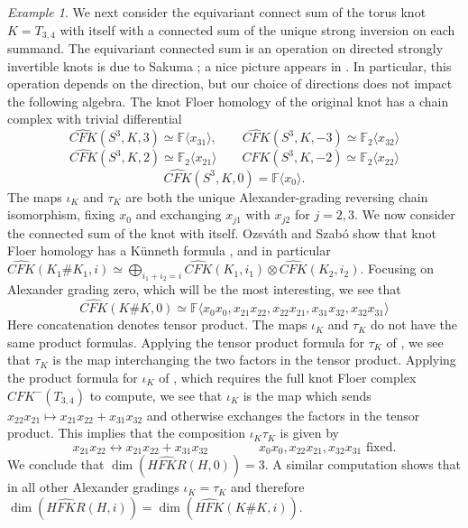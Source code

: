 \documentclass[11pt,reqno]{amsart}
\theoremstyle{definition}
\theoremstyle{remark}
\newtheorem{example}[thm]{Example}
\newcommand{\bF}{\mathbb{F}}
\newcommand{\CFK}{\mathit{CFK}}
\newcommand{\HFK}{\mathit{HFK}}
\newcommand\CFKhat{\widehat{\CFK}}
\newcommand\HFKhat{\widehat{\HFK}}
\newcommand \HFKR{ \widehat{\mathit{HFKR}}}
\numberwithin{equation}{section}
\begin{document}
\begin{example}
We next consider the equivariant connect sum of the torus knot $K=T_{3,4}$ with itself with a connected sum of the unique strong inversion on each summand. The equivariant connected sum is an operation on directed strongly invertible knots is due to Sakuma \cite{Sakumainvertible}; a nice picture appears in \cite[Definition 2.4]{DMS:equivariant}. In particular, this operation depends on the direction, but our choice of directions does not impact the following algebra. The knot Floer homology of the original knot has a chain complex with trivial differential 
%
\[\CFKhat(S^3,K,3) \simeq \mathbb F\langle x_{31} \rangle, \qquad \CFKhat(S^3,K,-3) \simeq \mathbb F_2\langle x_{32} \rangle\] \[ \CFKhat(S^3,K,2) \simeq \mathbb F_2\langle x_{21} \rangle\qquad \CFKhat(S^3,K,-2) \simeq \mathbb F_2\langle x_{22} \rangle \] \[\CFKhat(S^3,K, 0) = \mathbb F \langle x_0 \rangle.\] 
%
The maps $\iota_K$ and $\tau_K$ are both the unique Alexander-grading reversing chain isomorphism, fixing $x_0$ and exchanging $x_{j1}$ with $x_{j2}$ for $j=2,3$. We now consider the connected sum of the knot with itself. Ozsv{\'a}th and Szab{\'o} show that knot Floer homology has a K{\"u}nneth formula \cite[Section 7]{OSKnots}, and in particular $\CFKhat(K_1 \# K_1, i) \simeq \bigoplus_{i_1+i_2=i} \CFKhat(K_1,i_1) \otimes \CFKhat(K_2,i_2)$. Focusing on Alexander grading zero, which will be the most interesting, we see that
%
\[ \CFKhat(K\#K, 0) \simeq \bF \langle x_0x_0, x_{21}x_{22}, x_{22}x_{21}, x_{31}x_{32}, x_{32}x_{31} \rangle \]
%
Here concatenation denotes tensor product. The maps $\iota_K$ and $\tau_K$ do not have the same product formulas. Applying the tensor product formula for $\tau_K$ of \cite[Theorem 1.7]{DMS:equivariant}, we see that $\tau_K$ is the map interchanging the two factors in the tensor product. Applying the product formula for $\iota_K$ of \cite[Theorem 1.1]{ZemConnectedSums}, which requires the full knot Floer complex $CFK^-(T_{3,4})$ to compute, we see that $\iota_K$ is the map which sends $x_{22}x_{21} \mapsto x_{21}x_{22} + x_{31}x_{32}$ and otherwise exchanges the factors in the tensor product. This implies that the composition $\iota_K\tau_K$ is given by
%
\[ x_{21}x_{22} \leftrightarrow x_{21}x_{22}+x_{31}x_{32}\qquad \qquad x_0x_0, x_{22}x_{21}, x_{32}x_{31} \text{ fixed.}\]
%
We conclude that $\dim(\HFKR(H,0)) = 3$. A similar computation shows that in all other Alexander gradings $\iota_K =\tau_K$ and therefore $\dim(\HFKR(H,i)) = \dim(\HFKhat(K\#K,i))$. \end{example}
\end{document}
